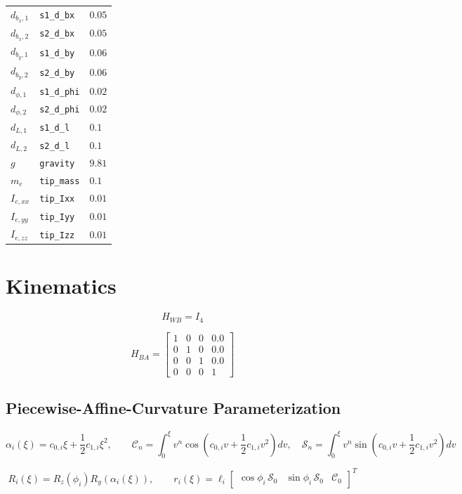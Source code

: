\documentclass[11pt]{article}
\begin{document}
\begin{longtable}{lll}
$d_{b_x,1}$ & \texttt{s1\_d\_bx} & $0.05$ \\
$d_{b_x,2}$ & \texttt{s2\_d\_bx} & $0.05$ \\
$d_{b_y,1}$ & \texttt{s1\_d\_by} & $0.06$ \\
$d_{b_y,2}$ & \texttt{s2\_d\_by} & $0.06$ \\
$d_{\phi,1}$ & \texttt{s1\_d\_phi} & $0.02$ \\
$d_{\phi,2}$ & \texttt{s2\_d\_phi} & $0.02$ \\
$d_{L,1}$ & \texttt{s1\_d\_l} & $0.1$ \\
$d_{L,2}$ & \texttt{s2\_d\_l} & $0.1$ \\
$g$ & \texttt{gravity} & $9.81$ \\
$m_e$ & \texttt{tip\_mass} & $0.1$ \\
$I_{e,xx}$ & \texttt{tip\_Ixx} & $0.01$ \\
$I_{e,yy}$ & \texttt{tip\_Iyy} & $0.01$ \\
$I_{e,zz}$ & \texttt{tip\_Izz} & $0.01$ \\
\hline
\end{longtable}

\section{Kinematics}
\begin{equation}
H_{WB}=I_4
\end{equation}

\begin{equation}
H_{BA}=\begin{bmatrix}1 & 0 & 0 & 0.0\\0 & 1 & 0 & 0.0\\0 & 0 & 1 & 0.0\\0 & 0 & 0 & 1\end{bmatrix}\label{eq:mount-transform}
\end{equation}

\subsection{Piecewise-Affine-Curvature Parameterization}
\begin{equation}
\alpha_i(\xi)=c_{0,i}\xi+\frac12c_{1,i}\xi^2,\qquad \mathcal C_n=\int_0^\xi v^n\cos\!\left(c_{0,i}v+\frac12c_{1,i}v^2\right)dv,\quad \mathcal S_n=\int_0^\xi v^n\sin\!\left(c_{0,i}v+\frac12c_{1,i}v^2\right)dv
\end{equation}

\begin{equation}
R_i(\xi)=R_z(\phi_i)R_y(\alpha_i(\xi)),\qquad r_i(\xi)=\ell_i\begin{bmatrix}\cos\phi_i\,\mathcal S_0&\sin\phi_i\,\mathcal S_0&\mathcal C_0\end{bmatrix}^{T}
\end{equation}
\end{document}
